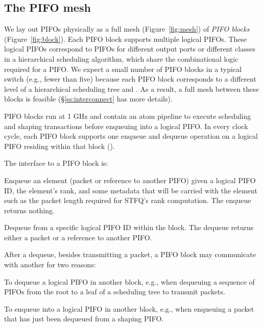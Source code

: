 \subsection{The PIFO mesh}
\label{ss:mesh}

We lay out PIFOs physically as a full mesh (Figure~\ref{fig:mesh}) of
{\em PIFO blocks} (Figure~\ref{fig:block}). Each PIFO block supports
multiple logical PIFOs. These logical PIFOs correspond to PIFOs for
different output ports or different classes in a
hierarchical scheduling algorithm, which share the combinational logic
required for a PIFO. We expect a small number of PIFO blocks in a
typical switch (e.g., fewer than five) because each PIFO block
corresponds to a different level of a hierarchical scheduling tree and
. As a result, a
full mesh between these blocks is feasible (\S\ref{ss:interconnect}
has more details).

PIFO blocks run at 1 GHz and contain an atom
pipeline to execute scheduling and shaping transactions before enqueuing into a
logical PIFO. In every clock cycle, each PIFO block supports one enqueue and
dequeue operation on a logical PIFO residing within that block
().

The interface to a PIFO block is:
\begin{CompactEnumerate}
\item Enqueue an element (packet or reference to another PIFO) given a
  logical PIFO ID, the element's rank, and some metadata that will be
  carried with the element such as the packet length required for
  STFQ's rank computation. The enqueue returns nothing.
  \item Dequeue from a specific logical PIFO ID within the block. The dequeue
   returns either a packet or a reference to another PIFO.
\end{CompactEnumerate}

After a dequeue, besides transmitting a packet, a PIFO block may
communicate with another for two reasons:
 \begin{CompactEnumerate}
 \item To dequeue a logical PIFO in another block, e.g., when dequeuing a
   sequence of PIFOs from the root to a leaf of a scheduling tree to transmit
   packets.
 
 \item To enqueue into a logical PIFO in another block, e.g., when
   enqueuing a packet that has just been dequeued from a shaping
   PIFO.
 \end{CompactEnumerate}

